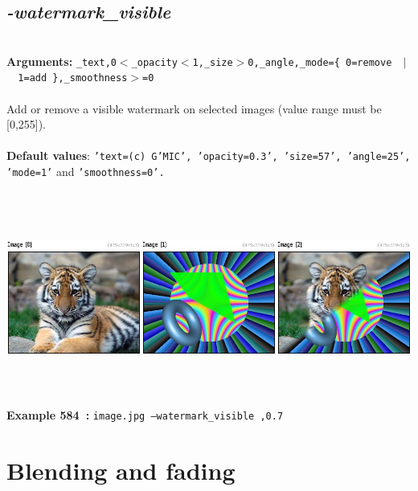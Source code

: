 \documentclass[a4paper,11pt,twoside]{book}
\begin{document}
\subsection{\emph{-watermark\_visible} }\vspace*{-0.5em}
~\\\textbf{Arguments: } 
{\small \texttt{\_text,0$<$\_opacity$<$1,\_size$>$0,\_angle,\_mode=\{ 0=remove ~$|$~ 1=add \},\_smoothness$>$=0}}\\~\\
Add or remove a visible watermark on selected images (value range must be [0,255]).
~\\~\\\textbf{Default values}: {\small \texttt{'text=(c) G'MIC', 'opacity=0.3', 'size=57', 'angle=25', 'mode=1'} and \texttt{'smoothness=0'.}}
\begin{center}\includegraphics[keepaspectratio=true,height=7cm,width=\textwidth]{img/gmic_def584.jpg}\\
{\footnotesize \textbf{Example 584~:} \texttt{image.jpg --watermark\_visible ,0.7}}
\end{center}
\section{Blending and fading}
\end{document}
